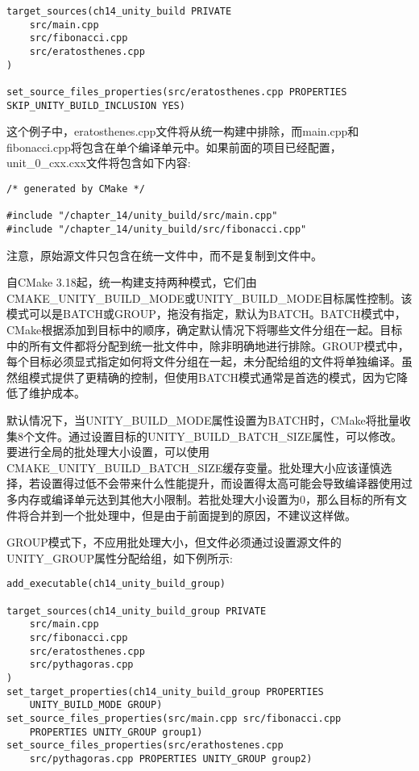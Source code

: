 \begin{lstlisting}[style=styleCMake]
target_sources(ch14_unity_build PRIVATE
	src/main.cpp
	src/fibonacci.cpp
	src/eratosthenes.cpp
)

set_source_files_properties(src/eratosthenes.cpp PROPERTIES
SKIP_UNITY_BUILD_INCLUSION YES)
\end{lstlisting}

这个例子中，eratosthenes.cpp文件将从统一构建中排除，而main.cpp和fibonacci.cpp将包含在单个编译单元中。如果前面的项目已经配置，unit\_0\_cxx.cxx文件将包含如下内容:

\begin{lstlisting}[style=styleCXX]
/* generated by CMake */

#include "/chapter_14/unity_build/src/main.cpp"
#include "/chapter_14/unity_build/src/fibonacci.cpp"
\end{lstlisting}

注意，原始源文件只包含在统一文件中，而不是复制到文件中。

自CMake 3.18起，统一构建支持两种模式，它们由CMAKE\_UNITY\_BUILD\_MODE或UNITY\_BUILD\_MODE目标属性控制。该模式可以是BATCH或GROUP，拖没有指定，默认为BATCH。BATCH模式中，CMake根据添加到目标中的顺序，确定默认情况下将哪些文件分组在一起。目标中的所有文件都将分配到统一批文件中，除非明确地进行排除。GROUP模式中，每个目标必须显式指定如何将文件分组在一起，未分配给组的文件将单独编译。虽然组模式提供了更精确的控制，但使用BATCH模式通常是首选的模式，因为它降低了维护成本。

默认情况下，当UNITY\_BUILD\_MODE属性设置为BATCH时，CMake将批量收集8个文件。通过设置目标的UNITY\_BUILD\_BATCH\_SIZE属性，可以修改。要进行全局的批处理大小设置，可以使用CMAKE\_UNITY\_BUILD\_BATCH\_SIZE缓存变量。批处理大小应该谨慎选择，若设置得过低不会带来什么性能提升，而设置得太高可能会导致编译器使用过多内存或编译单元达到其他大小限制。若批处理大小设置为0，那么目标的所有文件将合并到一个批处理中，但是由于前面提到的原因，不建议这样做。

GROUP模式下，不应用批处理大小，但文件必须通过设置源文件的UNITY\_GROUP属性分配给组，如下例所示:

\begin{lstlisting}[style=styleCMake]
add_executable(ch14_unity_build_group)

target_sources(ch14_unity_build_group PRIVATE
	src/main.cpp
	src/fibonacci.cpp
	src/eratosthenes.cpp
	src/pythagoras.cpp
)
set_target_properties(ch14_unity_build_group PROPERTIES
	UNITY_BUILD_MODE GROUP)
set_source_files_properties(src/main.cpp src/fibonacci.cpp
	PROPERTIES UNITY_GROUP group1)
set_source_files_properties(src/erathostenes.cpp
	src/pythagoras.cpp PROPERTIES UNITY_GROUP group2)
\end{lstlisting}

